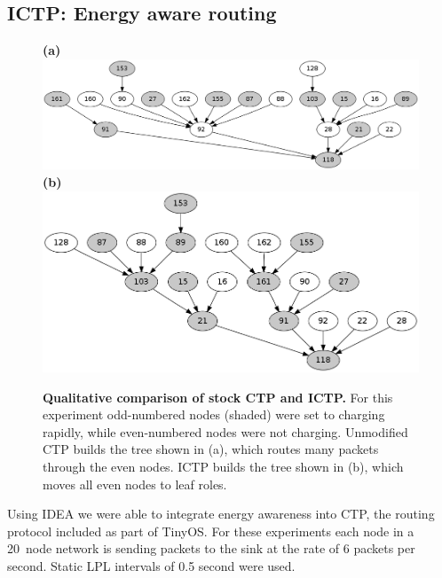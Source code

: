 \subsection{ICTP: Energy aware routing}

\begin{figure}[t]
\begin{center}
\textbf{(a)}\\
\includegraphics[width=\hsize]{./idea/figs/STOCK.png}\\
\textbf{(b)}\\
\includegraphics[width=\hsize]{./idea/figs/ICTP.png}\\
\end{center}
\caption{\small{\textbf{Qualitative comparison of stock CTP and ICTP.}
For this experiment odd-numbered nodes (shaded) were set to charging rapidly,
while even-numbered nodes were not charging. Unmodified CTP builds the tree
shown in (a), which routes many packets through the even nodes. ICTP builds
the tree shown in (b), which moves all even nodes to leaf roles.}}
\label{fig-ictpqualitative}
\end{figure}

Using IDEA we were able to integrate energy awareness into CTP, the routing
protocol included as part of TinyOS. For these experiments each node in a
20~node network is sending packets to the sink at the rate of 6 packets per
second. Static LPL intervals of 0.5 second were used. 

